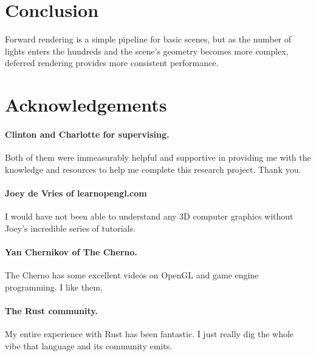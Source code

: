 \documentclass[11pt]{article}
\newcommand{\emoji}[1]{{\emojifont{#1}}}
\begin{document}
\section{Conclusion}

Forward rendering is a simple pipeline for basic scenes, but as the number of lights enters the hundreds and the scene's geometry becomes more complex, deferred rendering provides more consistent performance.

\section{Acknowledgements}

\paragraph{Clinton and Charlotte for supervising.}
Both of them were immeasurably helpful and supportive in providing me with the knowledge and resources to help me complete this research project.
Thank you. \emoji{🙏}

\paragraph{Joey de Vries of learnopengl.com}
I would have not been able to understand any 3D computer graphics without Joey's incredible series of tutorials.

\paragraph{Yan Chernikov of The Cherno.}
The Cherno has some excellent videos on OpenGL and game engine programming.
I like them. \emoji{👍}

\paragraph{The Rust community.}
My entire experience with Rust has been fantastic.
I just really dig the whole vibe that language and its community emits.

\newpage


\printbibliography[heading=bibintoc]{}
\end{document}
